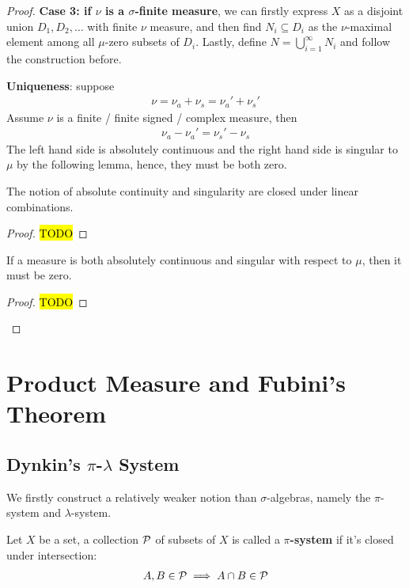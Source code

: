 \documentclass[11pt]{article}
\begin{document}
\begin{theorem}
\begin{proof}
			\textbf{Case 3: if $\nu$ is a $\sigma$-finite measure}, we can firstly express $X$ as a disjoint union $D_1, D_2, \dots$  with finite $\nu$ measure, and then find $N_i \subseteq D_i$ as the $\nu$-maximal element among all $\mu$-zero subsets of $D_i$.
			Lastly, define $N = \bigcup_{i=1}^\infty N_i$ and follow the construction before.
			
			\textbf{Uniqueness}: suppose
			\begin{align}
				\nu = \nu_a + \nu_s = \nu_a' + \nu_s'
			\end{align}
			Assume $\nu$ is a finite / finite signed / complex measure, then
			\begin{align}
				\nu_a - \nu_a' = \nu_s' - \nu_s
			\end{align}
			The left hand side is absolutely continuous and the right hand side is singular to $\mu$ by the following lemma, hence, they must be both zero.
			\begin{tcolorbox}
			\begin{lemma}
				The notion of absolute continuity and singularity are closed under linear combinations.
			\end{lemma}
			\begin{proof}
				\hl{TODO}
			\end{proof}
			\end{tcolorbox}
			\begin{tcolorbox}
			\begin{lemma}
				If a measure is both absolutely continuous and singular with respect to $\mu$, then it must be zero.
			\end{lemma}
			\begin{proof}
				\hl{TODO}
			\end{proof}
			\end{tcolorbox}
		\end{proof}
	\end{theorem}
	
	\newpage
	\section{Product Measure and Fubini's Theorem}
	\subsection{Dynkin's $\pi$-$\lambda$ System}
	We firstly construct a relatively weaker notion than $\sigma$-algebras, namely the $\pi$-system and $\lambda$-system.
	\begin{definition}
		Let $X$ be a set, a collection $\mathcal{{P}}$ of subsets of $X$ is called a \textbf{$\pi$-system} if it's closed under intersection:
		\begin{align}
			A, B \in \mathcal{{P}} \implies A \cap B \in \mathcal{{P}}
		\end{align}
	\end{definition}
	
\end{document}
